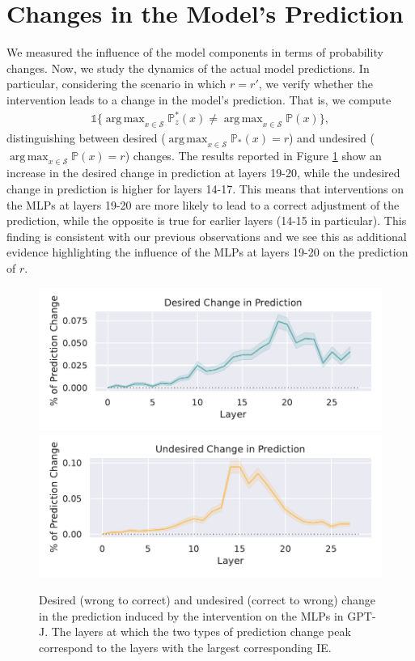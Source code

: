 \documentclass[11pt]{article}
\DeclareMathOperator*{\argmax}{arg\,max}
\begin{document}
\section{Changes in the Model's Prediction}
\label{appendix:cp}
We measured the influence of the model components in terms of probability changes. Now, we study the dynamics of the actual model predictions.
In particular, considering the scenario in which $r = r'$, we verify whether the intervention leads to a change in the model's prediction. That is, we compute
\begin{align}
    \label{eq:cp}
    \mathds{1} \{\argmax_{x \in \mathcal{S}} \mathbb{P}_z^*(x) \neq  \argmax_{x \in \mathcal{S}} \mathbb{P}(x)   \},
\end{align}
distinguishing between desired ($\argmax_{x \in \mathcal{S}} \mathbb{P}_*(x) = r$) and undesired ($\argmax_{x \in \mathcal{S}} \mathbb{P}(x) = r$) changes.
The results reported in Figure \ref{fig:cp} show an increase in the desired change in prediction at layers 19-20, while the undesired change in prediction is higher for layers 14-17. This means that interventions on the MLPs at layers 19-20 are more likely to lead to a correct adjustment of the prediction, while the opposite is true for earlier layers (14-15 in particular). This finding is consistent with our previous observations and we see this as additional evidence highlighting the influence of the MLPs at layers 19-20 on the prediction of $r$.

\begin{figure}[t]
    \centering
    \includegraphics[width=0.9\columnwidth]{img/desired_cp.pdf}
    \includegraphics[width=0.9\columnwidth]{img/undesired_cp.pdf}
    \caption{Desired (wrong to correct) and undesired (correct to wrong) change in the prediction induced by the intervention on the MLPs in GPT-J. The layers at which the two types of prediction change peak correspond to the layers with the largest corresponding IE.}
    \label{fig:cp}
\end{figure}
\end{document}
